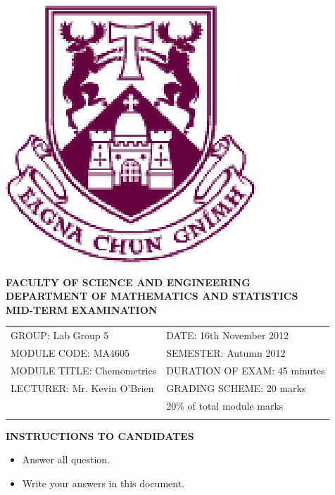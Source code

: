 \documentclass{article}
\begin{document}
\begin{center}
       \includegraphics[scale=0.60]{shieldtransparent2}
\end{center}

\begin{center}
\vspace{1cm}
\large \bf {FACULTY OF SCIENCE AND ENGINEERING} \\[0.5cm]
\normalsize DEPARTMENT OF MATHEMATICS AND STATISTICS \\[1.25cm]
\large \bf {MID-TERM EXAMINATION } \\[1.5cm]
\end{center}

\begin{tabular}{ll}
GROUP: Lab Group 5 & DATE: 16th November 2012 \\[1cm]
MODULE CODE: MA4605 & SEMESTER: Autumn 2012\\[1cm]
MODULE TITLE: Chemometrics & DURATION OF EXAM: 45 minutes \\[1cm]
LECTURER: Mr. Kevin O'Brien & GRADING SCHEME: 20 marks \\
& \phantom{GRADING SCHEME:} \footnotesize {20\% of total module marks} \\[0.2cm]
\\[1cm]
\end{tabular}
\begin{center}
{\bf INSTRUCTIONS TO CANDIDATES}\\
\begin{itemize} \item Answer all question.\\
\item Write your answers in this document.
\end{itemize}
\end{center}
\end{document}
